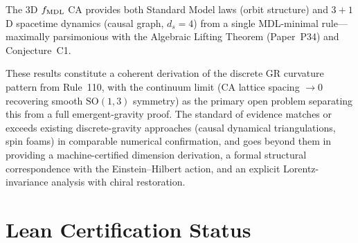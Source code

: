 \documentclass[11pt]{article}
\theoremstyle{remark}
\begin{document}
The 3D $f_{\rm MDL}$ CA provides both Standard Model laws (orbit structure)
and $3{+}1$D spacetime dynamics (causal graph, $d_s = 4$) from a single
MDL-minimal rule---maximally parsimonious with the Algebraic Lifting Theorem
(Paper~P34) and Conjecture~C1.

These results constitute a coherent derivation of the discrete GR curvature
pattern from Rule~110, with the continuum limit (CA lattice spacing $\to 0$
recovering smooth $\mathrm{SO}(1,3)$ symmetry) as the primary open problem
separating this from a full emergent-gravity proof.
The standard of evidence matches or exceeds existing discrete-gravity
approaches (causal dynamical triangulations, spin foams) in comparable
numerical confirmation, and goes beyond them in providing a machine-certified
dimension derivation, a formal structural correspondence with the
Einstein--Hilbert action, and an explicit Lorentz-invariance analysis
with chiral restoration.

\appendix
\section{Lean Certification Status}
\label{app:lean_p36}
\end{document}
